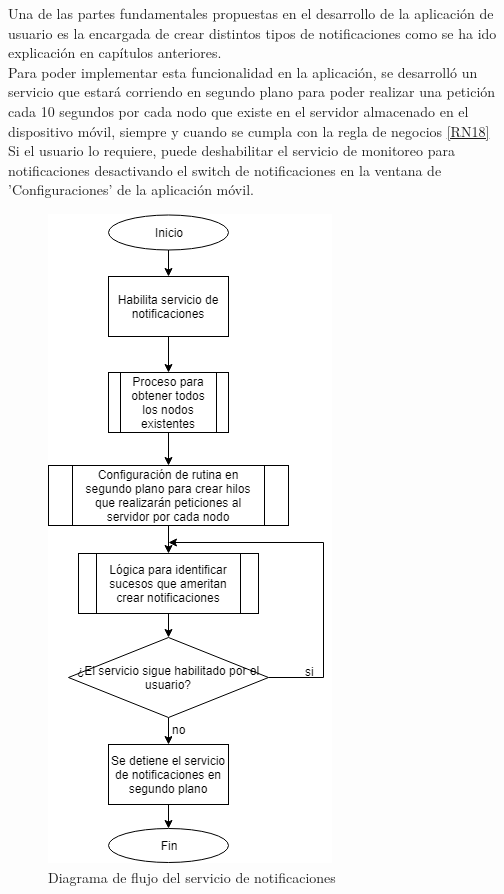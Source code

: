 Una de las partes fundamentales propuestas en el desarrollo de la aplicación de usuario es la encargada de crear distintos tipos de notificaciones como se ha ido explicación en capítulos anteriores. \\ \newline
Para poder implementar esta funcionalidad en la aplicación, se desarrolló un servicio que estará corriendo en segundo plano para poder realizar una petición cada 10 segundos por cada nodo que existe en el servidor almacenado en el dispositivo móvil, siempre y cuando se cumpla con la regla de negocios \ref{RN18} 
\\ \newline
Si el usuario lo requiere, puede deshabilitar el servicio de monitoreo para notificaciones desactivando el switch de notificaciones en la ventana de 'Configuraciones' de la aplicación móvil.\\ \newline 

\begin{figure}[H]
	\centering
	\includegraphics[scale=.7]{Capitulo5/images/df_notificaciones.png}
	\caption{Diagrama de flujo del servicio de notificaciones}	\label{fig:Diagrama de flujo del servicio de notificaciones}
\end{figure} 

